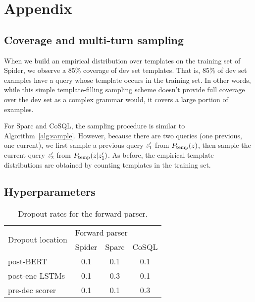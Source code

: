 \documentclass[11pt,a4paper]{article}
\begin{document}





\clearpage
\appendix




\section{Appendix}
\label{sec:appendix}

\subsection{Coverage and multi-turn sampling}
\label{app:sampling}

When we build an empirical distribution over templates on the training set of Spider, we observe a 85\% coverage of dev set templates.
That is, 85\% of dev set examples have a query whose template occurs in the training set.
In other words, while this simple template-filling sampling scheme doesn't provide full coverage over the dev set as a complex grammar would, it covers a large portion of examples.

For Sparc and CoSQL, the sampling procedure is similar to Algorithm~\ref{alg:sample}.
However, because there are two queries (one previous, one current), we first sample a previous query ${z}^\prime_1$ from $P_{\rm{temp}}({z})$, then sample the current query ${z}^\prime_2$ from $P_{\rm{temp}}({z} | {z}^\prime_1)$.
As before, the empirical template distributions are obtained by counting templates in the training set.






\subsection{Hyperparameters}
\label{app:hyperparameters}

\begin{table}[ht]
\centering
\begin{tabular}{@{}lccc@{}}
\toprule
\multirow{2}{*}{Dropout location} & \multicolumn{3}{l}{Forward parser} \\ \cmidrule(l){2-4} 
                                  & Spider     & Sparc     & CoSQL     \\ \midrule
post-BERT                         & 0.1        & 0.1       & 0.1       \\
post-enc LSTMs                & 0.1        & 0.3       & 0.1       \\
pre-dec scorer                & 0.1        & 0.1       & 0.3       \\ \bottomrule
\end{tabular}
\caption{Dropout rates for the forward parser.}
\label{tab:dropout-forward}
\end{table}
\end{document}
